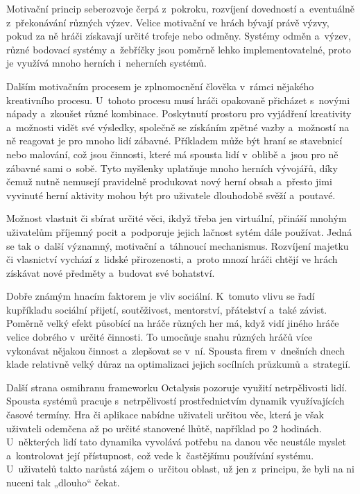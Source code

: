 \documentclass[twoside, 12pt]{article}
\begin{document}
Motivační princip seberozvoje čerpá z~pokroku, rozvíjení dovedností
a~eventuálně z~překonávání různých výzev.
Velice motivační ve hrách bývají právě výzvy,
pokud za ně hráči získavají určité trofeje nebo odměny.
Systémy odměn a~výzev, různé bodovací systémy a~žebříčky
jsou poměrně lehko implementovatelné,
proto je využívá mnoho herních i~neherních systémů.

Dalším motivačním procesem je zplnomocnění člověka v~rámci nějakého kreativního procesu.
U~tohoto procesu musí hráči opakovaně přicházet s~novými
nápady a~zkoušet různé kombinace. Poskytnutí prostoru pro vyjádření
kreativity a~možnosti vidět své výsledky, společně se získáním zpětné vazby
a~možností na ně reagovat je pro mnoho lidí zábavné.
Příkladem může být hraní se stavebnicí nebo malování,
což jsou činnosti, které má spousta lidí v~oblibě a~jsou pro ně zábavné sami o~sobě.
Tyto myšlenky uplatňuje mnoho herních vývojářů,
díky čemuž nutně nemusejí pravidelně produkovat nový herní obsah
a~přesto jimi vyvinuté herní aktivity mohou být pro uživatele dlouhodobě svěží a~poutavé.

Možnost vlastnit či sbírat určité věci, ikdyž třeba jen virtuální,
přináší mnohým uživatelům příjemný pocit a~podporuje jejich lačnost
sytém dále používat. Jedná se tak o~další významný, motivační a~táhnoucí mechanismus.
Rozvíjení majetku či vlasnictví vychází z~lidské přirozenosti,
a~proto mnozí hráči chtějí ve hrách získávat nové předměty
a~budovat své bohatství.

Dobře známým hnacím faktorem je vliv sociální.
K~tomuto vlivu se řadí kupříkladu sociální přijetí, soutěživost, mentorství,
přátelství a~také závist. Poměrně velký efekt působící na hráče různých her
má, když vidí jiného hráče velice dobrého v~určité činnosti.
To umocňuje snahu různých hráčů více vykonávat nějakou činnost a~zlepšovat se v~ní.
Spousta firem v~dnešních dnech klade relativně velký důraz na optimalizaci
jejich socílních průzkumů a~strategií.

Další strana osmihranu frameworku Octalysis pozoruje využití
netrpělivosti lidí. Spousta systémů pracuje s~netrpělivostí
prostřednictvím dynamik využívajících časové termíny.
Hra či aplikace nabídne uživateli určitou věc, která je však uživateli
odemčena až po určité stanovené lhůtě, například po 2 hodinách.
U~některých lidí tato dynamika vyvolává potřebu na danou věc neustále myslet
a~kontrolovat její přístupnost, což vede k~častějšímu používání systému.
U~uživatelů takto narůstá zájem o~určitou oblast, už jen z~principu,
že byli na ni nuceni tak „dlouho“ čekat.
\end{document}
